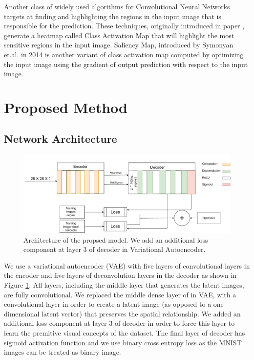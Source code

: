 \documentclass{bmvc2k}
\begin{document}
Another class of widely used algorithms for  Convolutional Neural Networks  targets at finding and highlighting the  regions in the input image that is responsible for the prediction.
These techniques, originally introduced in paper \cite{zhou2016learning}, generate a heatmap called Class Activation Map that will highlight the most sensitive regions in the input image.
Saliency Map, introduced by Symonyan et.al. in 2014 \cite{simonyan2014deep} is another variant of class activation map computed by optimizing the input image using the gradient of output prediction with respect to the input image.

\section{Proposed Method}
\subsection{Network Architecture}

\begin{figure}[!t]
\centering
\includegraphics[width=0.9\linewidth]{images/cnn_arch_bmvc}
\vspace{0.2in}

\caption{Architecture of the propsed model. We add an additional loss component at layer 3 of decoder in Variational Autoencoder.}
\label{cnn_arch}
\end{figure}

We use a variational autoencoder (VAE) with five layers of convolutional layers in the encoder and five layers of deconvolution layers in the decoder as shown in Figure \ref{cnn_arch}.
All layers, including the middle layer that generates the latent images, are fully convolutional.
We replaced the middle dense layer of in VAE, with a convolutional layer in order to create a latent image (as opposed to a one dimensional latent vector) that preserves the spatial relationship.
We added an additional loss component at layer 3 of decoder in order to force this layer to learn the premitive visual concepts of the dataset.
The final layer of decoder has sigmoid activation function and we use binary cross entropy loss as the MNIST images can be treated as binary image.
\end{document}
